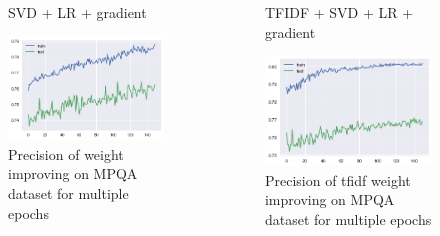 \documentclass[xcolor={table}]{beamer}
\begin{document}
\begin{frame}{}
	\begin{columns}
   				\begin{figure}[H]
        			\centering
        			\caption*{SVD + LR + gradient}
        			\includegraphics[height=0.4\textheight]{images/MPQADataset_grad.png}
        			\caption{Precision of weight improving on MPQA dataset for multiple epochs}
        		\end{figure}

        		\begin{figure}[H]
        			\centering
        			\caption*{TFIDF + SVD + LR + gradient}
        			\includegraphics[height=0.4\textheight]{images/MPQADataset_tfidf_grad.png}
        			\caption{Precision of tfidf weight improving on MPQA dataset for multiple epochs}
        		\end{figure}
	\end{columns}        		
\end{frame} 
\end{document}

